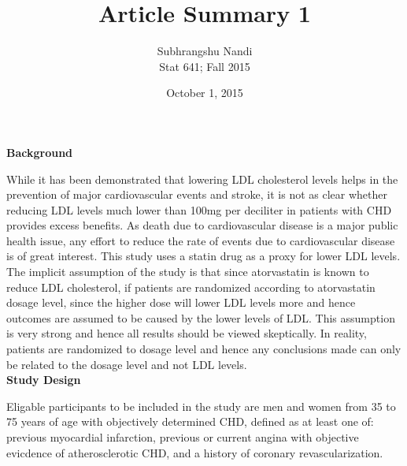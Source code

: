 \documentclass[11pt,a4paper]{article}
\begin{document}
\title{Article Summary 1}
\author{Subhrangshu Nandi\\
  Stat 641; Fall 2015}
\date{October 1, 2015}

\maketitle

\noindent
\textbf{Background}

While it has been demonstrated that lowering LDL cholesterol levels helps in the prevention of major cardiovascular events and stroke, it is not as clear whether reducing LDL levels much lower than 100mg per deciliter in patients with CHD provides excess benefits. As death due to cardiovascular disease is a major public health issue, any effort to reduce the rate of events due to cardiovascular disease is of great interest. This study uses a statin drug as a proxy for lower LDL levels. The implicit assumption of the study is that since atorvastatin is known to reduce LDL cholesterol, if patients are randomized according to atorvastatin dosage level, since the higher dose will lower LDL levels more and hence outcomes are assumed to be caused by the lower levels of LDL. This assumption is very strong and hence all results should be viewed skeptically. In reality, patients are randomized to dosage level and hence any conclusions made can only be related to the dosage level and not LDL levels. \\

\noindent
\textbf{Study Design}

Eligable participants to be included in the study are men and women from 35 to 75 years of age with objectively determined CHD, defined as at least one of: previous myocardial infarction, previous or current angina with objective evicdence of atherosclerotic CHD, and a history of coronary revascularization. 
\end{document}
